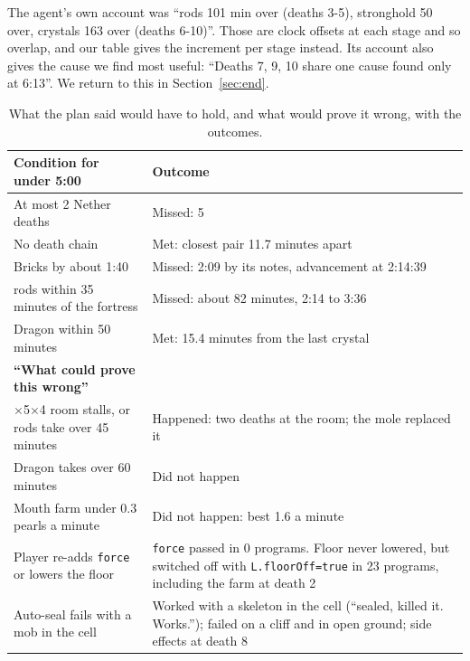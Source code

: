 \documentclass[11pt,a4paper]{article}
\begin{document}
The agent's own account was ``rods 101 min over (deaths 3-5), stronghold 50 over, crystals 163 over (deaths 6-10)''. Those are clock offsets at each stage and so overlap, and our table gives the increment per stage instead. Its account also gives the cause we find most useful: ``Deaths 7, 9, 10 share one cause found only at 6:13''. We return to this in Section~\ref{sec:end}.

\begin{table}[t]
  \caption{What the plan said would have to hold, and what would prove it wrong, with the outcomes.}
  \label{tab:conditions}
  \small
  \begin{tabularx}{\textwidth}{@{}>{\raggedright\arraybackslash}p{5.4cm}X@{}}
    \toprule
    \textbf{Condition for under 5:00} & \textbf{Outcome} \\
    \midrule
    At most 2 Nether deaths & Missed: 5 \\
    No death chain & Met: closest pair 11.7 minutes apart \\
    Bricks by about 1:40 & Missed: 2:09 by its notes, advancement at 2:14:39 \\
    7 rods within 35 minutes of the fortress & Missed: about 82 minutes, 2:14 to 3:36 \\
    Dragon within 50 minutes & Met: 15.4 minutes from the last crystal \\
    \midrule
    \textbf{``What could prove this wrong''} & \\
    \midrule
    5$\times$5$\times$4 room stalls, or rods take over 45 minutes & Happened: two deaths at the room; the mole replaced it \\
    Dragon takes over 60 minutes & Did not happen \\
    Mouth farm under 0.3 pearls a minute & Did not happen: best 1.6 a minute \\
    Player re-adds \texttt{force} or lowers the floor & \texttt{force} passed in 0 programs. Floor never lowered, but switched off with \texttt{L.floorOff=true} in 23 programs, including the farm at death 2 \\
    Auto-seal fails with a mob in the cell & Worked with a skeleton in the cell (``sealed, killed it. Works.''); failed on a cliff and in open ground; side effects at death 8 \\
    \bottomrule
  \end{tabularx}
\end{table}
\end{document}
